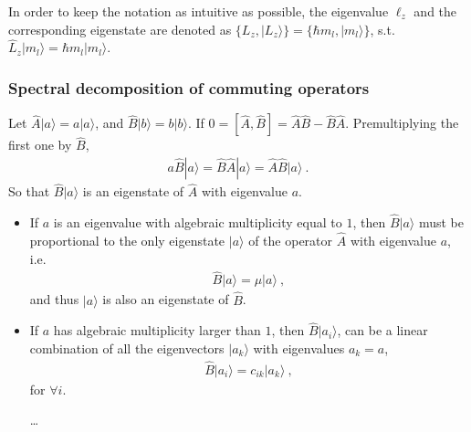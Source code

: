 \documentclass[letterpaper,10pt,english]{jupyterBook}
\begin{document}
\sphinxAtStartPar
In order to keep the notation as intuitive as possible, the eigenvalue \(\ell_z\) and the corresponding eigenstate are denoted as \(\{ L_{z}, | L_z \rangle\} = \{ \hbar m_l, | m_l \rangle \}\), s.t. \(\hat{L}_z | m_l \rangle = \hbar m_l | m_l \rangle\).
\subsubsection*{Spectral decomposition of commuting operators}

\sphinxAtStartPar
Let \(\hat{A} | a \rangle = a | a \rangle\), and \(\hat{B} | b \rangle = b | b \rangle\). If \(0 = [ \hat{A}, \hat{B} ] = \hat{A} \hat{B} - \hat{B} \hat{A}\). Pre\sphinxhyphen{}multiplying the first one by \(\hat{B}\),
\begin{equation*}
\begin{split}a \hat{B} | a \rangle = \hat{B} \hat{A} | a \rangle = \hat{A} \hat{B} | a \rangle \ .\end{split}
\end{equation*}
\sphinxAtStartPar
So that \(\hat{B} | a \rangle\) is an eigenstate of \(\hat{A}\) with eigenvalue \(a\).
\begin{itemize}
\item {} 
\sphinxAtStartPar
If \(a\) is an eigenvalue with algebraic multiplicity equal to \(1\), then \(\hat{B} | a \rangle\) must be proportional to the only eigenstate \(| a \rangle \) of the operator \(\hat{A}\) with eigenvalue \(a\), i.e.
\begin{equation*}
\begin{split}\hat{B} | a \rangle = \mu | a \rangle \ ,\end{split}
\end{equation*}
\sphinxAtStartPar
and thus \(| a \rangle\) is also an eigenstate of \(\hat{B}\).

\item {} 
\sphinxAtStartPar
If \(a\) has algebraic multiplicity larger than \(1\), then \(\hat{B} | a_i \rangle\), can be a linear combination of all the eigenvectors \(| a_k \rangle\) with eigenvalues \(a_k = a\),
\begin{equation*}
\begin{split}\hat{B} | a_i \rangle = c_{ik} | a_k \rangle  \ ,\end{split}
\end{equation*}
\sphinxAtStartPar
for \(\forall i\).

\sphinxAtStartPar
…

\end{itemize}
\end{document}
